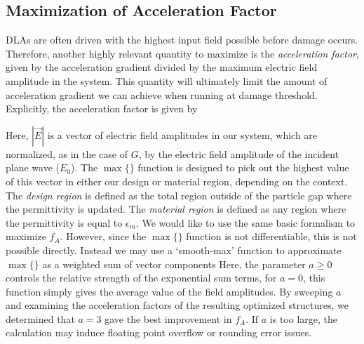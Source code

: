 \subsection{Maximization of Acceleration Factor}

DLAs are often driven with the highest input field possible before damage occurs.
Therefore, another highly relevant quantity to maximize is the \textit{acceleration factor}, given by the acceleration gradient divided by the maximum electric field amplitude in the system.
This quantity will ultimately limit the amount of acceleration gradient we can achieve when running at damage threshold.
Explicitly, the acceleration factor is given by

%
Here, $|\vec{E}|$ is a vector of electric field amplitudes in our system, which are normalized, as in the case of $G$, by the electric field amplitude of the incident plane wave ($E_0$).
The $\max\{\}$ function is designed to pick out the highest value of this vector in either our design or material region, depending on the context.
The \textit{design region} is defined as the total region outside of the particle gap where the permittivity is updated.
The \textit{material region} is defined as any region where the permittivity is equal to $\epsilon_m$.
We would like to use the same basic formalism to maximize $f_{A}$.
However, since the $\max\{\}$ function is not differentiable, this is not possible directly.
Instead we may use a `smooth-max' function to approximate $\max\{\}$ as a weighted sum of vector components
%
%
Here, the parameter $a \geq 0$ controls the relative strength of the exponential sum terms, for $a = 0$, this function simply gives the average value of the field amplitudes.
By sweeping $a$ and examining the acceleration factors of the resulting optimized structures, we determined that $a = 3$ gave the best improvement in $f_A$.
If $a$ is too large, the calculation may induce floating point overflow or rounding error issues.


